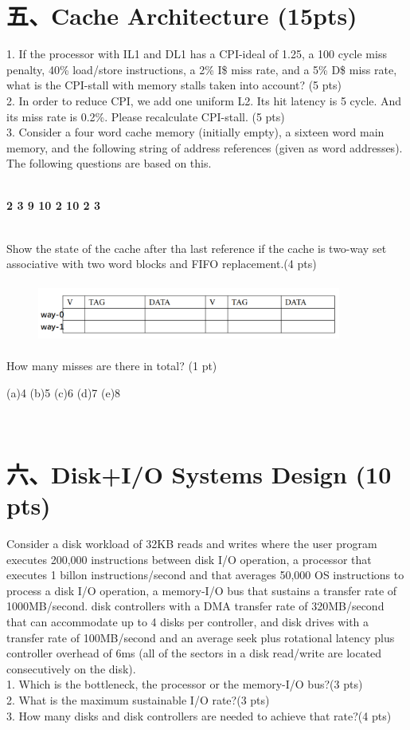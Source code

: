 \documentclass[UTF8]{ctexart}
\begin{document}
\section*{五、Cache Architecture (15pts)}
1. If the processor with IL1 and DL1 has a CPI-ideal of 1.25, a 100 cycle miss penalty, 40\% load/store instructions, a 2\% I\$ miss rate, and a 5\% D\$ miss rate,
what is the CPI-stall with memory stalls taken into account? (5 pts)\\
2. In order to reduce CPI, we add one uniform L2. Its hit latency is 5 cycle. And its miss rate is 0.2\%. Please recalculate CPI-stall. (5 pts)\\
3. Consider a four word cache memory (initially empty), a sixteen word main memory, and the following string of address references (given as word addresses). The 
following questions are based on this.\\\
\centerline{\bfseries 2 3 9 10 2 10 2 3}\\
Show the state of the cache after tha last reference if the cache is two-way set associative with two word blocks and FIFO replacement.(4 pts)
\begin{figure}[H]                                            
    \centering                                                
    \includegraphics[width=10cm,height=2cm]{5.png}        
    \caption*{}                                                                                 
\end{figure}  
How many misses are there in total? (1 pt)\\
\centerline{(a)4 (b)5 (c)6 (d)7 (e)8}\\
\section*{六、Disk+I/O Systems Design (10 pts)}
Consider a disk workload of 32KB reads and writes where the user program executes 200,000 instructions between disk I/O operation, a processor
that executes 1 billon instructions/second and that averages 50,000 OS instructions to process a disk I/O operation, a memory-I/O bus that sustains
a transfer rate of 1000MB/second. disk controllers with a DMA transfer rate of 320MB/second that can accommodate up to 4 disks per controller, and 
disk drives with a transfer rate of 100MB/second and an average seek plus rotational latency plus controller overhead of 6ms (all of the sectors in 
a disk read/write are located consecutively on the disk).\\
1. Which is the bottleneck, the processor or the memory-I/O bus?(3 pts)\\
2. What is the maximum sustainable I/O rate?(3 pts)\\
3. How many disks and disk controllers are needed to achieve that rate?(4 pts)\\
\end{document}
